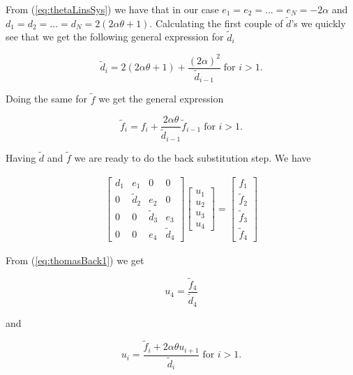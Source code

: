 \documentclass{article}
\begin{document}
From (\ref{eq:thetaLinsSys}) we have that in our case $e_1=e_2 = ... = e_N= -2 \alpha$ and $d_1 = d_2 = ... = d_N = 2(2\alpha \theta +1)$. Calculating the first couple of $\tilde{d}$'s we quickly see that we get the following general expression for $\tilde{d}_i$

\begin{equation}\label{eq:thomasDtilde}
	\tilde{d}_i = 2(2\alpha \theta +1) + \frac{(2\alpha)^2}{\tilde{d}_{i-1}}\;\text{for } i>1.
\end{equation}

Doing the same for $\tilde{f}$ we get the general expression

\begin{equation}\label{eq:thomasFtilde}
	\tilde{f}_i = f_i + \frac{2 \alpha \theta}{\tilde{d}_{i-1}} \tilde{f}_{i-1}\;\text{for } i>1.
\end{equation}

Having $\tilde{d}$ and $\tilde{f}$ we are ready to do the back substitution step. We have

\begin{subequations}
	\begin{align}
		\begin{bmatrix}
		d_1 & e_1 & 0 & 0\\
		0 & \tilde{d}_2 & e_2 & 0  \\
		0 & 0 & \tilde{d}_3 & e_3 \\
		0 & 0 & e_4 & \tilde{d}_4 
		\end{bmatrix}
		\begin{bmatrix} u_1\\ u_2 \\ u_3\\ u_4  \end{bmatrix}
		= \begin{bmatrix} f_1\\\tilde{f}_2 \\ \tilde{f}_3\\ \tilde{f}_4  \end{bmatrix}
	\end{align}\label{eq:thomasBack1}
\end{subequations}

From (\ref{eq:thomasBack1}) we get

\begin{equation}\label{eq:thomasULast}
	u_4 = \frac{\tilde{f}_4}{\tilde{d}_4}
\end{equation}

and

\begin{equation}\label{eq:thomasU}
	u_i = \frac{\tilde{f}_i + 2\alpha \theta u_{i+1}}{\tilde{d}_i}\; \text{for } i > 1.
\end{equation}
\end{document}
